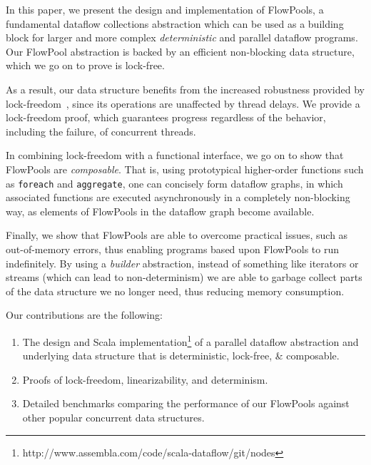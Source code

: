 \documentclass[runningheads,a4paper]{llncs}
\begin{document}
In this paper, we present the design and implementation of FlowPools, a
fundamental dataflow collections abstraction which can be used as a building
block for larger and more complex \textit{deterministic} and parallel
dataflow programs. Our FlowPool abstraction is backed by an efficient
non-blocking data structure, which we go on to prove is lock-free.

As a result, our data structure benefits from the increased robustness
provided by lock-freedom~\cite{Herlihy90}, since its operations are unaffected
by thread delays. We provide a lock-freedom proof, which guarantees progress
regardless of the behavior, including the failure, of concurrent threads.

In combining lock-freedom with a functional interface, we go on to show that
FlowPools are \textit{composable}. That is, using prototypical higher-order
functions such as \verb=foreach= and \verb=aggregate=, one can concisely form
dataflow graphs, in which associated functions are executed asynchronously in
a completely non-blocking way, as elements of FlowPools in the dataflow graph
become available.

Finally, we show that FlowPools are able to overcome practical issues, such as
out-of-memory errors, thus enabling programs based upon FlowPools to run
indefinitely. By using a \textit{builder} abstraction, instead of something
like iterators or streams (which can lead to non-determinism)
we are able to garbage collect parts of the
data structure we no longer need, thus reducing memory consumption.

Our contributions are the following:
\begin{enumerate}
\item The design and Scala implementation\footnote{http://www.assembla.com/code/scala-dataflow/git/nodes} 
of a parallel dataflow abstraction and underlying data structure that 
is deterministic, lock-free, \& composable.
\item Proofs of lock-freedom, linearizability, and determinism.
\item Detailed benchmarks comparing the performance of our FlowPools against
other popular concurrent data structures.
\end{enumerate}

\end{document}
